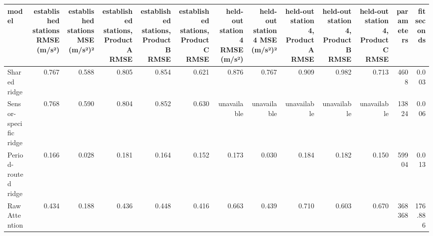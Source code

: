 \begin{tabular}{lrrrrrrrrrrrr}
\toprule
model & established stations RMSE (m/s²) & established stations MSE (m/s²)² & established stations, Product A RMSE & established stations, Product B RMSE & established stations, Product C RMSE & held-out station 4 RMSE (m/s²) & held-out station 4 MSE (m/s²)² & held-out station 4, Product A RMSE & held-out station 4, Product B RMSE & held-out station 4, Product C RMSE & parameters & fit seconds \\
\midrule
Shared ridge & 0.767 & 0.588 & 0.805 & 0.854 & 0.621 & 0.876 & 0.767 & 0.909 & 0.982 & 0.713 & 4608 & 0.003 \\
Sensor-specific ridge & 0.768 & 0.590 & 0.804 & 0.852 & 0.630 & unavailable & unavailable & unavailable & unavailable & unavailable & 13824 & 0.006 \\
Period-routed ridge & 0.166 & 0.028 & 0.181 & 0.164 & 0.152 & 0.173 & 0.030 & 0.184 & 0.182 & 0.150 & 59904 & 0.013 \\
Raw Attention & 0.434 & 0.188 & 0.436 & 0.448 & 0.416 & 0.663 & 0.439 & 0.710 & 0.603 & 0.670 & 368368 & 176.886 \\
\bottomrule
\end{tabular}
